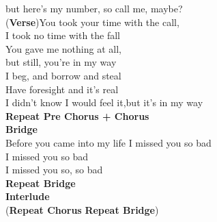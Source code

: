 but here's my number,    so call me, maybe?\\
(\textbf{Verse})You took your time with the call,\\
I took no time with the fall             \\     
You gave me nothing at all,\\
but still, you're in my way\\
I beg, and borrow and steal\\
Have foresight and it's real             \\    
I didn't know I would feel it,but it's in my way\\
\textbf{Repeat Pre Chorus + Chorus}\\
\textbf{Bridge}                   \\
Before you came into my life I missed you so bad\\
I missed you so bad\\
I missed you so, so bad\\
\textbf{Repeat Bridge}\\
\textbf{Interlude}            \\
(\textbf{Repeat Chorus} \textbf{Repeat Bridge})





